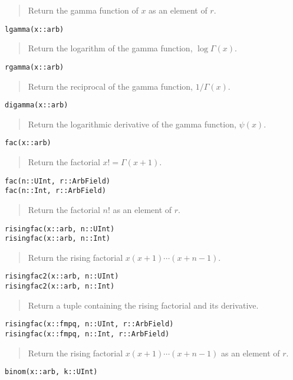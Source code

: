 \documentclass[a4paper,10pt]{article}
\newcommand{\desc}[1]{\vspace{-3mm}\begin{quote}#1\end{quote}}
\begin{document}
{{\desc{Return the gamma function of $x$ as an element of $r$.}

\begin{lstlisting}
lgamma(x::arb)
\end{lstlisting}

\desc{Return the logarithm of the gamma function, $\log \Gamma(x)$.}

\begin{lstlisting}
rgamma(x::arb)
\end{lstlisting}

\desc{Return the reciprocal of the gamma function, $1 / \Gamma(x)$.}

\begin{lstlisting}
digamma(x::arb)
\end{lstlisting}

\desc{Return the logarithmic derivative of the gamma function, $\psi(x)$.}

\begin{lstlisting}
fac(x::arb)
\end{lstlisting}

\desc{Return the factorial $x! = \Gamma(x+1)$.}

\begin{lstlisting}
fac(n::UInt, r::ArbField)
fac(n::Int, r::ArbField)
\end{lstlisting}

\desc{Return the factorial $n!$ as an element of $r$.}

\begin{lstlisting}
risingfac(x::arb, n::UInt)
risingfac(x::arb, n::Int)
\end{lstlisting}

\desc{Return the rising factorial $x (x+1) \cdots (x+n-1)$.}

\begin{lstlisting}
risingfac2(x::arb, n::UInt)
risingfac2(x::arb, n::Int)
\end{lstlisting}

\desc{Return a tuple containing the rising factorial and its derivative.}

\begin{lstlisting}
risingfac(x::fmpq, n::UInt, r::ArbField)
risingfac(x::fmpq, n::Int, r::ArbField)
\end{lstlisting}

\desc{Return the rising factorial $x (x+1) \cdots (x+n-1)$ as an element of $r$.}

\begin{lstlisting}
binom(x::arb, k::UInt)
\end{lstlisting}

}}
\end{document}
